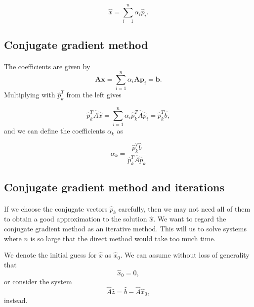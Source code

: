\documentclass[%
oneside,                 %
final,                   %
10pt]{article}
\begin{document}
\begin{equation*}
  \hat{x}  = \sum^{n}_{i=1} \alpha_i \hat{p}_i.
\end{equation*}



\subsection*{Conjugate gradient method}

\paragraph{}
The coefficients are given by
\begin{equation*}
    \mathbf{A}\mathbf{x} = \sum^{n}_{i=1} \alpha_i \mathbf{A} \mathbf{p}_i = \mathbf{b}.
\end{equation*}
Multiplying with $\hat{p}_k^T$  from the left gives

\begin{equation*}
  \hat{p}_k^T \hat{A}\hat{x} = \sum^{n}_{i=1} \alpha_i\hat{p}_k^T \hat{A}\hat{p}_i= \hat{p}_k^T \hat{b},
\end{equation*}
and we can define the coefficients $\alpha_k$ as

\begin{equation*}
    \alpha_k = \frac{\hat{p}_k^T \hat{b}}{\hat{p}_k^T \hat{A} \hat{p}_k}
\end{equation*}



\subsection*{Conjugate gradient method and iterations}

\paragraph{}

If we choose the conjugate vectors $\hat{p}_k$ carefully, 
then we may not need all of them to obtain a good approximation to the solution 
$\hat{x}$. 
We want to regard the conjugate gradient method as an iterative method. 
This will us to solve systems where $n$ is so large that the direct 
method would take too much time.

We denote the initial guess for $\hat{x}$ as $\hat{x}_0$. 
We can assume without loss of generality that
\begin{equation*}
\hat{x}_0=0,
\end{equation*}
or consider the system
\begin{equation*}
\hat{A}\hat{z} = \hat{b}-\hat{A}\hat{x}_0,
\end{equation*}
instead.
\end{document}
